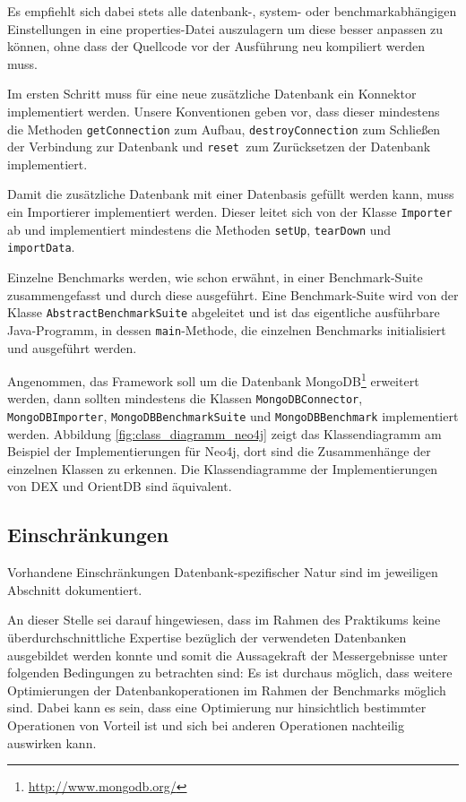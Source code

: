 \documentclass[11pt, a4paper, oneside]{article} %
\begin{document}
Es empfiehlt sich dabei stets alle datenbank-, system- oder benchmarkabhängigen Einstellungen in eine properties-Datei auszulagern um diese besser anpassen zu können, ohne dass der Quellcode vor der Ausführung neu kompiliert werden muss.

Im ersten Schritt muss für eine neue zusätzliche Datenbank ein Konnektor implementiert werden. Unsere Konventionen geben vor, dass dieser mindestens die Methoden \texttt{getConnection} zum Aufbau, \texttt{destroyConnection} zum Schließen der Verbindung zur Datenbank und \texttt{reset }zum Zurücksetzen der Datenbank implementiert.

Damit die zusätzliche Datenbank mit einer Datenbasis gefüllt werden kann, muss ein Importierer implementiert werden. Dieser leitet sich von der Klasse \texttt{Importer} ab und implementiert mindestens die Methoden \texttt{setUp}, \texttt{tearDown} und \texttt{importData}.

Einzelne Benchmarks werden, wie schon erwähnt, in einer Benchmark-Suite zusammengefasst und durch diese ausgeführt. Eine Benchmark-Suite wird von der Klasse \texttt{AbstractBenchmarkSuite} abgeleitet und ist das eigentliche ausführbare Java-Programm, in dessen \texttt{main}-Methode, die einzelnen Benchmarks initialisiert und ausgeführt werden.

Angenommen, das Framework soll um die Datenbank MongoDB\footnote{\url{http://www.mongodb.org/}} erweitert werden, dann sollten mindestens die Klassen \texttt{MongoDBConnector}, \texttt{MongoDBImporter}, \texttt{MongoDBBenchmarkSuite} und \texttt{MongoDBBenchmark} implementiert werden. Abbildung \ref{fig:class_diagramm_neo4j} zeigt das Klassendiagramm am Beispiel der Implementierungen für Neo4j, dort sind die Zusammenhänge der einzelnen Klassen zu erkennen. Die Klassendiagramme der Implementierungen von DEX und OrientDB sind äquivalent.

\subsection{Einschränkungen}

Vorhandene Einschränkungen Datenbank-spezifischer Natur sind im jeweiligen Abschnitt dokumentiert.

An dieser Stelle sei darauf hingewiesen, dass im Rahmen des Praktikums keine überdurchschnittliche Expertise bezüglich der verwendeten Datenbanken ausgebildet werden konnte und somit die Aussagekraft der Messergebnisse unter folgenden Bedingungen zu betrachten sind: Es ist durchaus möglich, dass weitere Optimierungen der Datenbankoperationen im Rahmen der Benchmarks möglich sind. Dabei kann es sein, dass eine Optimierung nur hinsichtlich bestimmter Operationen von Vorteil ist und sich bei anderen Operationen nachteilig auswirken kann.
\end{document}
